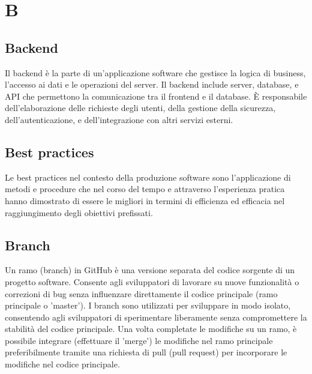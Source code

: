 \section*{B} 
\subsection*{Backend} 
Il backend è la parte di un'applicazione software che gestisce la logica di business, l'accesso ai dati e le operazioni del server. Il backend include server, database, e API che permettono la comunicazione tra il frontend e il database. È responsabile dell'elaborazione delle richieste degli utenti, della gestione della sicurezza, dell'autenticazione, e dell'integrazione con altri servizi esterni.
\subsection*{Best practices} 
Le best practices nel contesto della produzione software sono l'applicazione di metodi e procedure che nel corso del tempo e attraverso l'esperienza pratica hanno dimostrato di essere le migliori in termini di efficienza ed efficacia nel raggiungimento degli obiettivi prefissati.
\subsection*{Branch} 
Un ramo (branch) in GitHub è una versione separata del codice sorgente di un progetto software. Consente agli sviluppatori di lavorare su nuove funzionalità o correzioni di bug senza influenzare direttamente il codice principale (ramo principale o 'master'). I branch sono utilizzati per sviluppare in modo isolato, consentendo agli sviluppatori di sperimentare liberamente senza compromettere la stabilità del codice principale. Una volta completate le modifiche su un ramo, è possibile integrare (effettuare il 'merge') le modifiche nel ramo principale preferibilmente tramite una richiesta di pull (pull request) per incorporare le modifiche nel codice principale.
